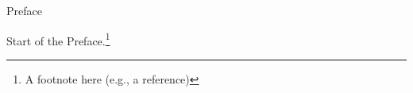 \documentclass[main_brownies.tex]{subfiles}
\begin{document}
\newrefsection %

\checkoddpage
\ifoddpage
\else
	\newpage\thispagestyle{empty}
	\mbox{}
	\newpage
\fi




\thispagestyle{frontmattertitle}
\pagestyle{frontmatter} %

\vspace*{5cm} %

\begin{flushright}
\titlestyle\Huge
	Preface
\end{flushright}



Start of the Preface.\footnote{A footnote here (e.g., a reference)}

\Blindtext[5][3]


\end{document}
